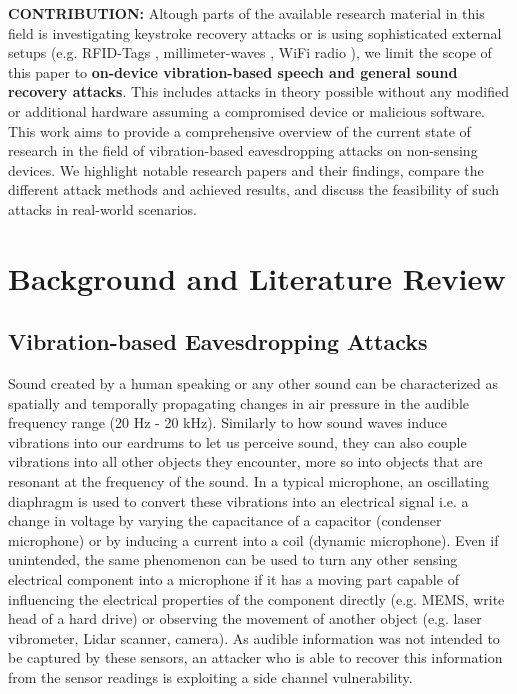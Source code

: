 \documentclass[sigconf, nonacm]{acmart}
\begin{document}
\textbf{CONTRIBUTION:} Altough parts of the available research material in this field is investigating keystroke recovery attacks \cite{Touchtone2023}\cite{TouchLogger2011}\cite{TapLogger2012} or is using sophisticated external setups (e.g. RFID-Tags \cite{RFMic2023}, millimeter-waves \cite{MMMic2022}, WiFi radio \cite{ART2015}), we limit the scope of this paper to \textbf{on-device vibration-based speech and general sound recovery attacks}.
This includes attacks in theory possible without any modified or additional hardware assuming a compromised device or malicious software.
This work aims to provide a comprehensive overview of the current state of research in the field of vibration-based eavesdropping attacks on non-sensing devices.
We highlight notable research papers and their findings, compare the different attack methods and achieved results, and discuss the feasibility of such attacks in real-world scenarios.

\section{Background and Literature Review}
\subsection{Vibration-based Eavesdropping Attacks}
Sound created by a human speaking or any other sound can be characterized as spatially and temporally propagating changes in air pressure in the audible frequency range (20 Hz - 20 kHz).
Similarly to how sound waves induce vibrations into our eardrums to let us perceive sound, they can also couple vibrations into all other objects they encounter, more so into objects that are resonant at the frequency of the sound.
In a typical microphone, an oscillating diaphragm is used to convert these vibrations into an electrical signal i.e. a change in voltage by varying the capacitance of a capacitor (condenser microphone) or by inducing a current into a coil (dynamic microphone).
Even if unintended, the same phenomenon can be used to turn any other sensing electrical component into a microphone if it has a moving part capable of influencing the electrical properties of the component directly (e.g. MEMS, write head of a hard drive) or observing the movement of another object (e.g. laser vibrometer, Lidar scanner, camera).
As audible information was not intended to be captured by these sensors, an attacker who is able to recover this information from the sensor readings is exploiting a side channel vulnerability.
\end{document}

